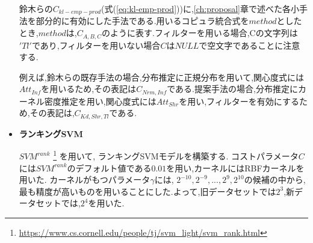 \begin{itemize}
    鈴木らの$C_{kl-emp-prod}$(式(\ref{eq:kl-emp-prod}))に,\ref{ch:proposal}章で述べた各小手法を部分的に有効にした手法である.用いるコピュラ統合式を$method$としたとき,$method$は,$C_{A,B,C}$のように表す.フィルターを用いる場合,Cの文字列は$'Tl'$であり,フィルターを用いない場合$C$は$NULL$で空文字であることに注意する.\par
例えば,鈴木らの既存手法の場合,分布推定に正規分布を用いて,関心度式には$Att_{Inf}$を用いるため,その表記は$C_{Nrm,Inf}$である.提案手法の場合,分布推定にカーネル密度推定を用い,関心度式には$Att_{Shr}$を用い,フィルターを有効にするため,その表記は,$C_{Kd,Shr,Tl}$である.

\item {\bf ランキングSVM}
    \par
    $SVM^{rank}$ \footnote{\url{https://www.cs.cornell.edu/people/tj/svm_light/svm_rank.html}} \cite{rankingSVMTool}を用いて, ランキングSVMモデルを構築する.
    コストパラメータ$C$には$SVM^{rank}$のデフォルト値である$0.01$を用い,カーネルにはRBFカーネルを用いた.
    カーネルがもつパラメータ$\gamma$には, $2^{-10}, 2^{-9}, ..., 2^{9}, 2^{10}$の候補の中から, 最も精度が高いものを用いることにした.よって,旧データセットでは$2^3$,新データセットでは,$2^4$を用いた.
\end{itemize}

